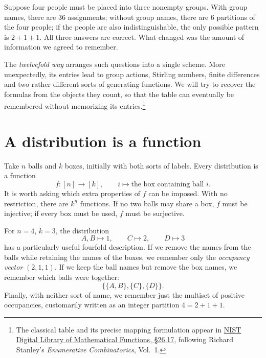 
Suppose four people must be placed into three nonempty groups. With group names, there are \(36\) assignments; without group names, there are \(6\) partitions of the four people; if the people are also indistinguishable, the only possible pattern is \(2+1+1\). All three answers are correct. What changed was the amount of information we agreed to remember.

The \emph{twelvefold way} arranges such questions into a single scheme. More unexpectedly, its entries lead to group actions, Stirling numbers, finite differences and two rather different sorts of generating functions. We will try to recover the formulas from the objects they count, so that the table can eventually be remembered without memorizing its entries.\footnote{The classical table and its precise mapping formulation appear in \href{https://dlmf.nist.gov/26.17}{NIST Digital Library of Mathematical Functions, \S26.17}, following Richard Stanley's \emph{Enumerative Combinatorics}, Vol.~1.}

\section{A distribution is a function}

Take \(n\) balls and \(k\) boxes, initially with both sorts of labels. Every distribution is a function
\[
 f:[n]\longrightarrow[k],\qquad
 i\longmapsto\text{the box containing ball }i.
\]
It is worth asking which extra properties of \(f\) can be imposed. With no restriction, there are \(k^n\) functions. If no two balls may share a box, \(f\) must be injective; if every box must be used, \(f\) must be surjective.

For \(n=4\), \(k=3\), the distribution
\[
 A,B\longmapsto1,\qquad C\longmapsto2,\qquad D\longmapsto3
\]
has a particularly useful fourfold description. If we remove the names from the balls while retaining the names of the boxes, we remember only the \emph{occupancy vector} \((2,1,1)\). If we keep the ball names but remove the box names, we remember which balls were together:
\[
 \bigl\{\{A,B\},\{C\},\{D\}\bigr\}.
\]
Finally, with neither sort of name, we remember just the multiset of positive occupancies, customarily written as an integer partition \(4=2+1+1\).

